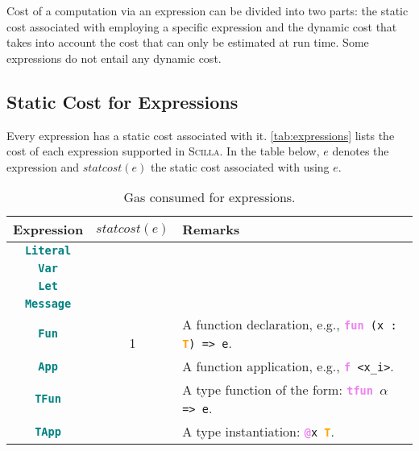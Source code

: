 \documentclass[9pt]{article}
\begin{document}
Cost of a computation via an expression can be divided into two parts: the
static cost associated with employing a specific expression and the dynamic
cost that takes into account the cost that can only be estimated at run time.
Some expressions do not entail any dynamic cost.

\subsection{Static Cost for Expressions}

Every expression has a static cost associated with it.
\autoref{tab:expressions} lists the cost of each expression supported in
\textsc{Scilla}. In the table below, $e$ denotes the expression and
$statcost(e)$ the static cost associated with using $e$.

\begin{table}[!hbt]
	\caption{Gas consumed for expressions. \label{tab:expressions} }
\centering
	\begin{tabular}{|c|c|p{8.5cm}|}
	\hline
		\textbf{Expression} & \textbf{$statcost(e)$} & \textbf{Remarks} \\ \hline
		\textbf{\texttt{\textcolor{teal}{Literal}}}  & \multirow{9}{*}{1}  & \\
		\cline{1-1} \cline{3-3}
		\textbf{\texttt{\textcolor{teal}{Var}}}  &  & \\ \cline{1-1}\cline{3-3}

		\textbf{\texttt{\textcolor{teal}{Let}}}  &  & \\ \cline{1-1}\cline{3-3}

		\textbf{\texttt{\textcolor{teal}{Message}}}  &  & \\ \cline{1-1}\cline{3-3}
		\textbf{\texttt{\textcolor{teal}{Fun}}}  &  & A function declaration, e.g., \texttt{\textbf{\textcolor{violet}{fun}} (x : \textbf{\textcolor{orange}{T}}) => e}. \\ \cline{1-1} \cline{3-3}
		\textbf{\texttt{\textcolor{teal}{App}}}  &  & A function application, e.g.,
			\texttt{\textbf{\textcolor{violet}{f}} <x\_i>}. \\ \cline{1-1}\cline{3-3}

			\textbf{\texttt{\textcolor{teal}{TFun}}}  &  & A type function of
			the form: \texttt{\textbf{\textcolor{violet}{tfun}} $\alpha$ => e}. \\ \cline{1-1}\cline{3-3}

			\textbf{\texttt{\textcolor{teal}{TApp}}}  &  & A type
			instantiation: \texttt{\textbf{\textcolor{violet}{@}}x
			\textbf{\textcolor{orange}{T}}}. \\ \cline{1-1}\cline{3-3}


\end{tabular}
\end{table}
\end{document}
